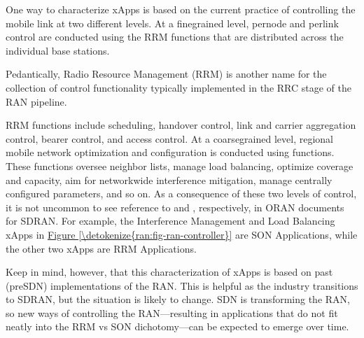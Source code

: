 \documentclass[a4paper,11pt,english]{sphinxmanual}
\begin{document}
\sphinxAtStartPar
One way to characterize xApps is based on the current practice of
controlling the mobile link at two different levels. At a fine\sphinxhyphen{}grained
level, per\sphinxhyphen{}node and per\sphinxhyphen{}link control are conducted using the RRM
functions that are distributed across the individual base stations.%
\begin{footnote}[1]\sphinxAtStartFootnote
Pedantically, Radio Resource Management (RRM) is another name
for the collection of control functionality typically
implemented in the RRC stage of the RAN pipeline.
%
\end{footnote} RRM functions include scheduling, handover control, link and
carrier aggregation control, bearer control, and access control. At a
coarse\sphinxhyphen{}grained level, regional mobile network optimization and
configuration is conducted using 
functions. These functions oversee neighbor lists, manage load
balancing, optimize coverage and capacity, aim for network\sphinxhyphen{}wide
interference mitigation, manage centrally configured parameters, and
so on. As a consequence of these two levels of control, it is not
uncommon to see reference to  and , respectively, in O\sphinxhyphen{}RAN documents for SD\sphinxhyphen{}RAN. For
example, the Interference Management and Load Balancing xApps in
\hyperref[\detokenize{ran:fig-ran-controller}]{Figure \ref{\detokenize{ran:fig-ran-controller}}} are SON Applications, while
the other two xApps are RRM Applications.

\sphinxAtStartPar
Keep in mind, however, that this characterization of xApps is based on
past (pre\sphinxhyphen{}SDN) implementations of the RAN. This is helpful as the
industry transitions to SD\sphinxhyphen{}RAN, but the situation is likely to change.
SDN is transforming the RAN, so new ways of controlling the
RAN—resulting in applications that do not fit neatly into the RRM vs SON
dichotomy—can be expected to emerge over time.
\end{document}
